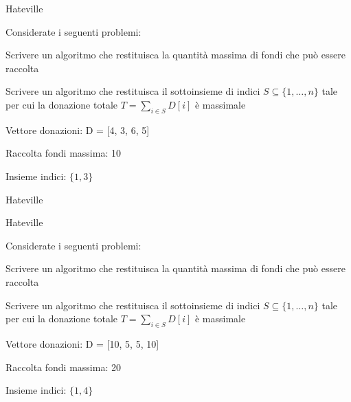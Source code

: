 \begin{frame}{Hateville}

Considerate i seguenti problemi:
\BIL
\item Scrivere un algoritmo che restituisca la quantità massima di
fondi che può essere raccolta
\item Scrivere un algoritmo che restituisca il sottoinsieme di indici 
$S \subseteq \{ 1, \ldots, n \}$ tale per cui la donazione totale
$T = \sum_{i \in S} D[i]$ è massimale
\EIL

\bigskip
{}
\BIL
\item Vettore donazioni: \textsf{D = [4, 3, 6, 5]}
\item Raccolta fondi massima: 10
\item Insieme indici: $\{1, 3\}$
\EIL

\end{frame}

\begin{frame}{Hateville}

\vspace{-9pt}

\end{frame}

\begin{frame}{Hateville}

Considerate i seguenti problemi:
\BIL
\item Scrivere un algoritmo che restituisca la quantità massima di
fondi che può essere raccolta
\item Scrivere un algoritmo che restituisca il sottoinsieme di indici 
$S \subseteq \{ 1, \ldots, n \}$ tale per cui la donazione totale
$T = \sum_{i \in S} D[i]$ è massimale
\EIL

\bigskip
{}
\BIL
\item Vettore donazioni: \textsf{D = [10, 5, 5, 10]}
\item Raccolta fondi massima: 20
\item Insieme indici: $\{1, 4\}$
\EIL

\end{frame}


